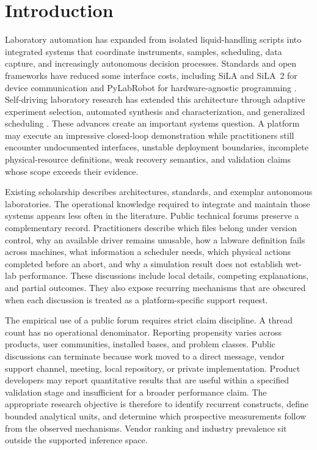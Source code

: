 \section{Introduction}
\label{sec:introduction}

Laboratory automation has expanded from isolated liquid-handling scripts into integrated systems that coordinate instruments, samples, scheduling, data capture, and increasingly autonomous decision processes. Standards and open frameworks have reduced some interface costs, including SiLA and SiLA~2 for device communication and PyLabRobot for hardware-agnostic programming \cite{bar2012sila,juchli2022sila2,porr2020gateway,bromig2022manager,wierenga2023pylabrobot}. Self-driving laboratory research has extended this architecture through adaptive experiment selection, automated synthesis and characterization, and generalized scheduling \cite{abolhasani2023rise,hung2024community,canty2023autonomy,fei2024alabos,cousty2024glas}. These advances create an important systems question. A platform may execute an impressive closed-loop demonstration while practitioners still encounter undocumented interfaces, unstable deployment boundaries, incomplete physical-resource definitions, weak recovery semantics, and validation claims whose scope exceeds their evidence.

Existing scholarship describes architectures, standards, and exemplar autonomous laboratories. The operational knowledge required to integrate and maintain those systems appears less often in the literature. Public technical forums preserve a complementary record. Practitioners describe which files belong under version control, why an available driver remains unusable, how a labware definition fails across machines, what information a scheduler needs, which physical actions completed before an abort, and why a simulation result does not establish wet-lab performance. These discussions include local details, competing explanations, and partial outcomes. They also expose recurring mechanisms that are obscured when each discussion is treated as a platform-specific support request.

The empirical use of a public forum requires strict claim discipline. A thread count has no operational denominator. Reporting propensity varies across products, user communities, installed bases, and problem classes. Public discussions can terminate because work moved to a direct message, vendor support channel, meeting, local repository, or private implementation. Product developers may report quantitative results that are useful within a specified validation stage and insufficient for a broader performance claim. The appropriate research objective is therefore to identify recurrent constructs, define bounded analytical units, and determine which prospective measurements follow from the observed mechanisms. Vendor ranking and industry prevalence sit outside the supported inference space.

